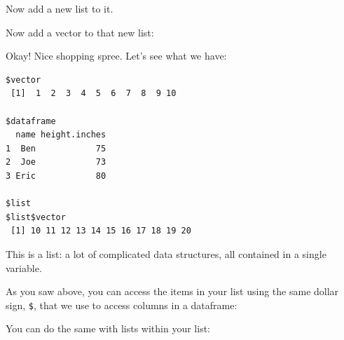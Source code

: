 \documentclass[
]{book}
\newenvironment{Shaded}{\begin{snugshade}}{\end{snugshade}}
\newcommand{\DecValTok}[1]{\textcolor[rgb]{0.00,0.00,0.81}{#1}}
\newcommand{\KeywordTok}[1]{\textcolor[rgb]{0.13,0.29,0.53}{\textbf{#1}}}
\newcommand{\NormalTok}[1]{#1}
\newcommand{\OperatorTok}[1]{\textcolor[rgb]{0.81,0.36,0.00}{\textbf{#1}}}
\newcommand{\StringTok}[1]{\textcolor[rgb]{0.31,0.60,0.02}{#1}}
\begin{document}
Now add a new list to it.

\begin{Shaded}
\end{Shaded}

Now add a vector to that new list:

\begin{Shaded}
\end{Shaded}

Okay! Nice shopping spree. Let's see what we have:

\begin{verbatim}
$vector
 [1]  1  2  3  4  5  6  7  8  9 10

$dataframe
  name height.inches
1  Ben            75
2  Joe            73
3 Eric            80

$list
$list$vector
 [1] 10 11 12 13 14 15 16 17 18 19 20
\end{verbatim}

This is a list: a lot of complicated data structures, all contained in a single variable.

As you saw above, you can access the items in your list using the same dollar sign, \texttt{\$}, that we use to access columns in a dataframe:

\begin{Shaded}
\end{Shaded}

You can do the same with lists within your list:

\begin{Shaded}
\end{Shaded}
\end{document}
